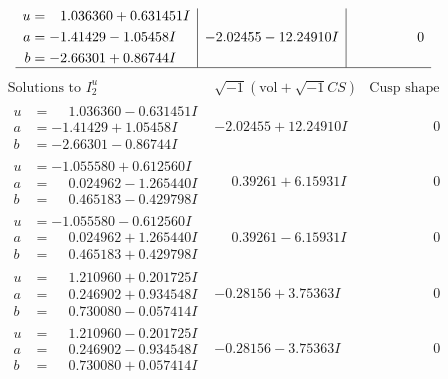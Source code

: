 \documentclass[1p]{elsarticle_modified}
\theoremstyle{definition}
\newcommand{\I}{\sqrt{-1}}
\begin{document}
$$\begin{array}{c|c|c}
\begin{aligned}
u &= \phantom{-}1.036360 + 0.631451 I \\
a &= -1.41429 - 1.05458 I \\
b &= -2.66301 + 0.86744 I\end{aligned}
 & -2.02455 - 12.24910 I & \phantom{-0.000000 } 0\\
 \hline 
 \end{array}$$\newpage$$\begin{array}{c|c|c}  
\text{Solutions to }I^u_{2}& \I (\text{vol} + \sqrt{-1}CS) & \text{Cusp shape}\\
 \hline 
\begin{aligned}
u &= \phantom{-}1.036360 - 0.631451 I \\
a &= -1.41429 + 1.05458 I \\
b &= -2.66301 - 0.86744 I\end{aligned}
 & -2.02455 + 12.24910 I & \phantom{-0.000000 } 0 \\ \hline\begin{aligned}
u &= -1.055580 + 0.612560 I \\
a &= \phantom{-}0.024962 - 1.265440 I \\
b &= \phantom{-}0.465183 - 0.429798 I\end{aligned}
 & \phantom{-}0.39261 + 6.15931 I & \phantom{-0.000000 } 0 \\ \hline\begin{aligned}
u &= -1.055580 - 0.612560 I \\
a &= \phantom{-}0.024962 + 1.265440 I \\
b &= \phantom{-}0.465183 + 0.429798 I\end{aligned}
 & \phantom{-}0.39261 - 6.15931 I & \phantom{-0.000000 } 0 \\ \hline\begin{aligned}
u &= \phantom{-}1.210960 + 0.201725 I \\
a &= \phantom{-}0.246902 + 0.934548 I \\
b &= \phantom{-}0.730080 - 0.057414 I\end{aligned}
 & -0.28156 + 3.75363 I & \phantom{-0.000000 } 0 \\ \hline\begin{aligned}
u &= \phantom{-}1.210960 - 0.201725 I \\
a &= \phantom{-}0.246902 - 0.934548 I \\
b &= \phantom{-}0.730080 + 0.057414 I\end{aligned}
 & -0.28156 - 3.75363 I & \phantom{-0.000000 } 0 \\ \hline\begin{aligned}

\end{aligned}
\end{array}$$
\end{document}
